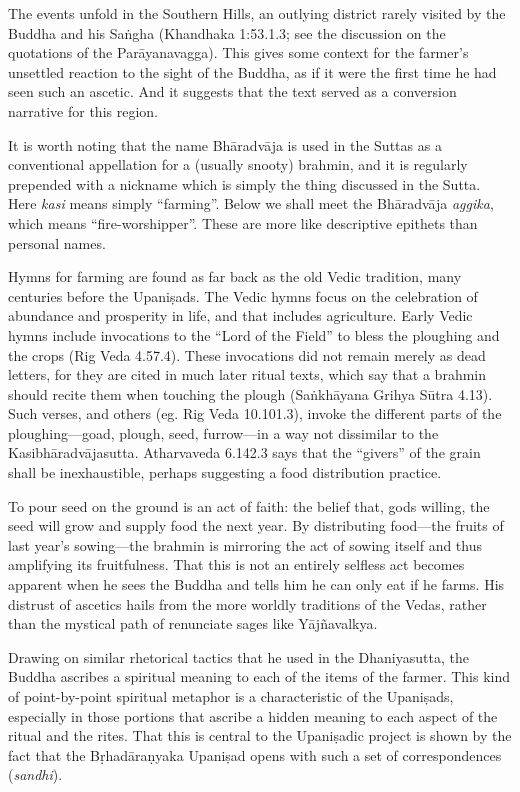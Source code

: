 \documentclass[12pt,openany]{book}%
\begin{document}
The events unfold in the Southern Hills, an outlying district rarely visited by the Buddha and his \textsanskrit{Saṅgha} (Khandhaka 1:53.1.3; see the discussion on the quotations of the \textsanskrit{Parāyanavagga}). This gives some context for the farmer’s unsettled reaction to the sight of the Buddha, as if it were the first time he had seen such an ascetic. And it suggests that the text served as a conversion narrative for this region.

It is worth noting that the name \textsanskrit{Bhāradvāja} is used in the Suttas as a conventional appellation for a (usually snooty) brahmin, and it is regularly prepended with a nickname which is simply the thing discussed in the Sutta. Here \textit{kasi} means simply “farming”. Below we shall meet the \textsanskrit{Bhāradvāja} \textit{aggika}, which means “fire-worshipper”. These are more like descriptive epithets than personal names.

Hymns for farming are found as far back as the old Vedic tradition, many centuries before the \textsanskrit{Upaniṣads}. The Vedic hymns focus on the celebration of abundance and prosperity in life, and that includes agriculture. Early Vedic hymns include invocations to the “Lord of the Field” to bless the ploughing and the crops (Rig Veda 4.57.4). These invocations did not remain merely as dead letters, for they are cited in much later ritual texts, which say that a brahmin should recite them when touching the plough (\textsanskrit{Saṅkhāyana} Grihya \textsanskrit{Sūtra} 4.13). Such verses, and others (eg. Rig Veda 10.101.3), invoke the different parts of the ploughing—goad, plough, seed, furrow—in a way not dissimilar to the \textsanskrit{Kasibhāradvājasutta}. Atharvaveda 6.142.3 says that the “givers” of the grain shall be inexhaustible, perhaps suggesting a food distribution practice.

To pour seed on the ground is an act of faith: the belief that, gods willing, the seed will grow and supply food the next year. By distributing food—the fruits of last year’s sowing—the brahmin is mirroring the act of sowing itself and thus amplifying its fruitfulness. That this is not an entirely selfless act becomes apparent when he sees the Buddha and tells him he can only eat if he farms. His distrust of ascetics hails from the more worldly traditions of the Vedas, rather than the mystical path of renunciate sages like \textsanskrit{Yājñavalkya}.

Drawing on similar rhetorical tactics that he used in the Dhaniyasutta, the Buddha ascribes a spiritual meaning to each of the items of the farmer. This kind of point-by-point spiritual metaphor is a characteristic of the \textsanskrit{Upaniṣads}, especially in those portions that ascribe a hidden meaning to each aspect of the ritual and the rites. That this is central to the \textsanskrit{Upaniṣadic} project is shown by the fact that the \textsanskrit{Bṛhadāraṇyaka} \textsanskrit{Upaniṣad} opens with such a set of correspondences (\textit{sandhi}).
\end{document}
